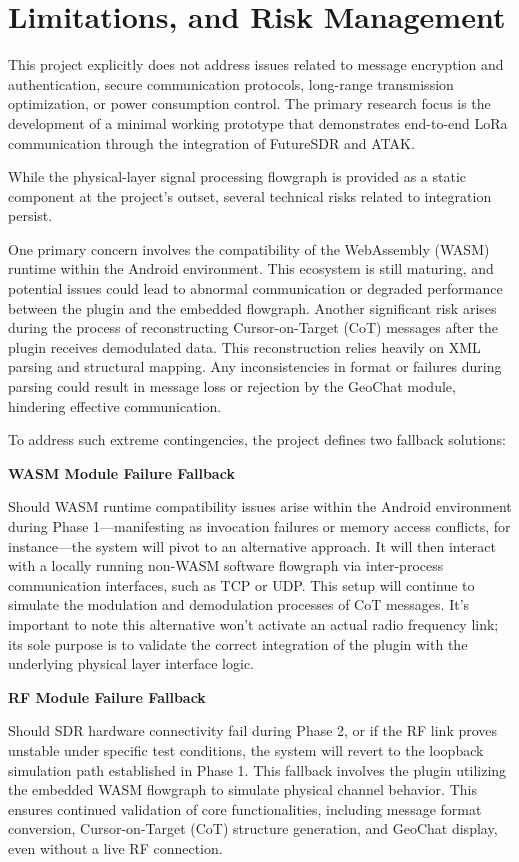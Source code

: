 \section{Limitations, and Risk Management}
This project explicitly does not address issues related to message encryption and authentication, secure communication protocols, long-range transmission optimization, or power consumption control. The primary research focus is the development of a minimal working prototype that demonstrates end-to-end LoRa communication through the integration of FutureSDR and ATAK.

While the physical-layer signal processing flowgraph is provided as a static component at the project's outset, several technical risks related to integration persist.

One primary concern involves the compatibility of the WebAssembly (WASM) runtime within the Android environment. This ecosystem is still maturing, and potential issues could lead to abnormal communication or degraded performance between the plugin and the embedded flowgraph. Another significant risk arises during the process of reconstructing Cursor-on-Target (CoT) messages after the plugin receives demodulated data. This reconstruction relies heavily on XML parsing and structural mapping. Any inconsistencies in format or failures during parsing could result in message loss or rejection by the GeoChat module, hindering effective communication.

To address such extreme contingencies, the project defines two fallback solutions:

\vspace{0.5em}
\noindent\textbf{WASM Module Failure Fallback}\par
Should WASM runtime compatibility issues arise within the Android environment during Phase 1—manifesting as invocation failures or memory access conflicts, for instance—the system will pivot to an alternative approach. It will then interact with a locally running non-WASM software flowgraph via inter-process communication interfaces, such as TCP or UDP. This setup will continue to simulate the modulation and demodulation processes of CoT messages. It's important to note this alternative won't activate an actual radio frequency link; its sole purpose is to validate the correct integration of the plugin with the underlying physical layer interface logic.

 \vspace{0.5em}
\noindent\textbf{RF Module Failure Fallback}\par
Should SDR hardware connectivity fail during Phase 2, or if the RF link proves unstable under specific test conditions, the system will revert to the loopback simulation path established in Phase 1. This fallback involves the plugin utilizing the embedded WASM flowgraph to simulate physical channel behavior. This ensures continued validation of core functionalities, including message format conversion, Cursor-on-Target (CoT) structure generation, and GeoChat display, even without a live RF connection.